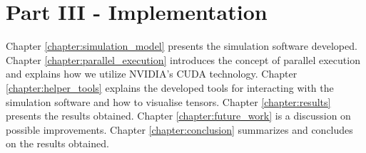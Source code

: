 \section*{Part III - Implementation}
Chapter \ref{chapter:simulation_model} presents the simulation
software developed.
%
Chapter \ref{chapter:parallel_execution} introduces the concept of
parallel execution and explains how we utilize NVIDIA's CUDA
technology.
%
Chapter \ref{chapter:helper_tools} explains the developed tools for
interacting with the simulation software and how to visualise
tensors.
%
Chapter \ref{chapter:results} presents the results obtained.
%
Chapter \ref{chapter:future_work} is a discussion on possible
improvements.
%
Chapter \ref{chapter:conclusion} summarizes and concludes on the
results obtained. 
